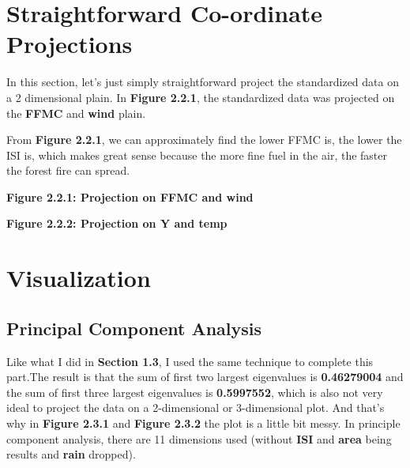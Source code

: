 \documentclass[titlepage,a4paper,12pt,thmsb]{report}
\begin{document}
\newpage

\section{Straightforward Co-ordinate Projections}

In this section, let's just simply straightforward project the standardized data on a 2 dimensional plain. In {\bf{Figure 2.2.1}}, the standardized data was projected on the {\bf{FFMC}} and {\bf{wind}} plain.

From {\bf{Figure 2.2.1}}, we can approximately find the lower FFMC is, the lower the ISI is, which makes great sense because the more fine fuel in the air, the faster the forest fire can spread.




\begin{center}
    \begin{figure}
        {\par}
    \end{figure}
    {\bf{Figure 2.2.1: Projection on FFMC and wind}}
\end{center}

\newpage

\begin{center}
    \begin{figure}
        {\par}
    \end{figure}
    {\bf{Figure 2.2.2: Projection on Y and temp}}
\end{center}

\newpage

\section{Visualization}

\subsection{Principal Component Analysis}

Like what I did in {\bf{Section 1.3}}, I used the same technique to complete this part.The result is that the sum of first two largest eigenvalues is {\bf{0.46279004}} and the sum of first three largest eigenvalues is {\bf{0.5997552}}, which is also not very ideal to project the data on a 2-dimensional or 3-dimensional plot. And that's why in {\bf{Figure 2.3.1}} and {\bf{Figure 2.3.2}} the plot is a little bit messy. In principle component analysis, there are 11 dimensions used (without {\bf{ISI}} and {\bf{area}} being results and {\bf{rain}} dropped).
\end{document}
